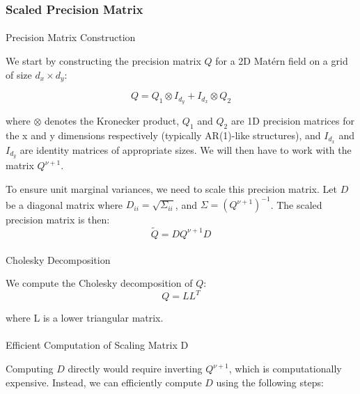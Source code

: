 \documentclass[journal=,manuscript=]{achemso}
\makeatletter
\let\oldparagraph\paragraph
\renewcommand{\paragraph}{
    \@ifstar
      \xxxParagraphStar
      \xxxParagraphNoStar
  }
\newcommand{\xxxParagraphStar}[1]{\oldparagraph*{#1}\mbox{}}
\newcommand{\xxxParagraphNoStar}[1]{\oldparagraph{#1}\mbox{}}
\makeatother
\begin{document}
\subsubsection{Scaled Precision Matrix}\label{scaled-precision-matrix}

\paragraph{Precision Matrix
Construction}\label{precision-matrix-construction-1}

We start by constructing the precision matrix \(Q\) for a 2D Matérn
field on a grid of size \(d_x \times d_y\):

\[
Q = Q_1 \otimes I_{d_y} + I_{d_x} \otimes Q_2 
\]

where \(\otimes\) denotes the Kronecker product, \(Q_1\) and \(Q_2\) are
1D precision matrices for the x and y dimensions respectively (typically
AR(1)-like structures), and \(I_{d_x}\) and \(I_{d_y}\) are identity
matrices of appropriate sizes. We will then have to work with the matrix
\(Q^{\nu + 1}\).

To ensure unit marginal variances, we need to scale this precision
matrix. Let \(D\) be a diagonal matrix where
\(D_{ii} = \sqrt{\Sigma_{ii}}\), and \(\Sigma = (Q^{\nu+1})^{-1}\). The
scaled precision matrix is then: \[
\tilde{Q} = DQ^{\nu+1}D
\]

\paragraph{Cholesky Decomposition}\label{cholesky-decomposition-1}

We compute the Cholesky decomposition of \(Q\): \[
Q = LL^T
\]

where L is a lower triangular matrix.

\paragraph{Efficient Computation of Scaling Matrix
D}\label{efficient-computation-of-scaling-matrix-d}

Computing \(D\) directly would require inverting \(Q^{\nu + 1}\), which
is computationally expensive. Instead, we can efficiently compute \(D\)
using the following steps:
\end{document}
